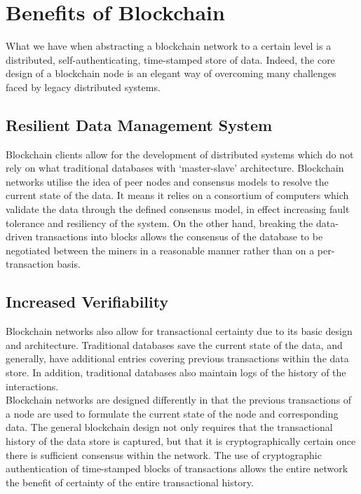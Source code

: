 \section{Benefits of Blockchain}
What we have when abstracting a blockchain network to a certain level is a distributed, self-authenticating, time-stamped store of data\cite{MonaxBlockchains}. Indeed, the core design of a blockchain node is an elegant way of overcoming many challenges faced by legacy distributed systems.

\subsection{Resilient Data Management System}
Blockchain clients allow for the development of distributed systems which do not rely on what traditional databases with ‘master-slave’ architecture. Blockchain networks utilise the idea of peer nodes and consensus models to resolve the current state of the data. It means it relies on a consortium of computers which validate the data through the defined consensus model, in effect increasing fault tolerance and resiliency of the system. On the other hand, breaking the data-driven transactions into blocks allows the consensus of the database to be negotiated between the miners in a reasonable manner rather than on a per-transaction basis.

\subsection{Increased Verifiability}
Blockchain networks also allow for transactional certainty due to its basic design and architecture. Traditional databases save the current state of the data, and generally, have additional entries covering previous transactions within the data store. In addition, traditional databases also maintain logs of the history of the interactions.
\\Blockchain networks are designed differently in that the previous transactions of a node are used to formulate the current state of the node and corresponding data. The general blockchain design not only requires that the transactional history of the data store is captured, but that it is cryptographically certain once there is sufficient consensus within the network. The use of cryptographic authentication of time-stamped blocks of transactions allows the entire network the benefit of certainty of the entire transactional history.

